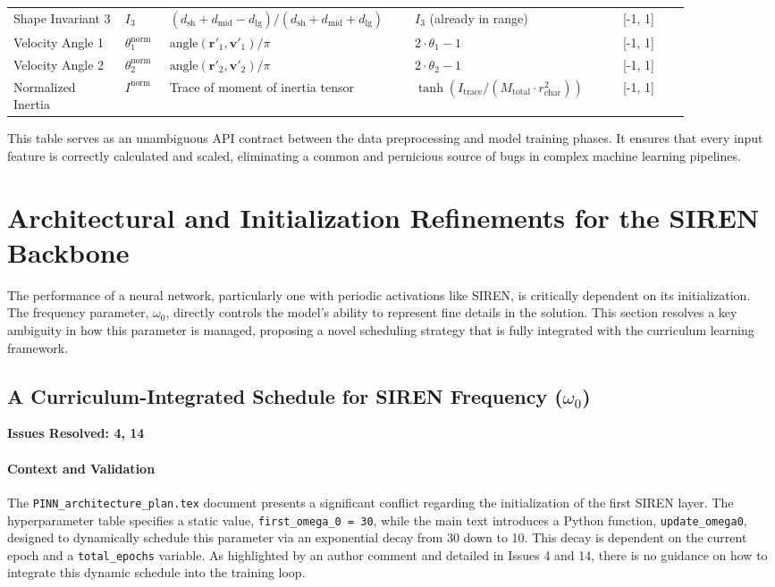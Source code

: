 \documentclass[11pt, a4paper]{article}
\begin{document}
\begin{longtable}{p{0.15\linewidth} p{0.06\linewidth} p{0.29\linewidth} p{0.29\linewidth} p{0.09\linewidth}}
Shape Invariant 3 & $I_3$ & $(d_{\text{sh}}+d_{\text{mid}}-d_{\text{lg}})/(d_{\text{sh}}+d_{\text{mid}}+d_{\text{lg}})$ & $I_3$ (already in range) & [-1, 1] \\
Velocity Angle 1 & $\theta_1^{\text{norm}}$ & $\text{angle}(\mathbf{r}'_1, \mathbf{v}'_1) / \pi$ & $2 \cdot \theta_1 - 1$ & [-1, 1] \\
Velocity Angle 2 & $\theta_2^{\text{norm}}$ & $\text{angle}(\mathbf{r}'_2, \mathbf{v}'_2) / \pi$ & $2 \cdot \theta_2 - 1$ & [-1, 1] \\
Normalized Inertia & $I^{\text{norm}}$ & Trace of moment of inertia tensor & $\tanh(I_{\text{trace}} / (M_{\text{total}} \cdot r_{\text{char}}^2))$ & [-1, 1] \\
\end{longtable}
\renewcommand{\arraystretch}{1.0}

This table serves as an unambiguous API contract between the data preprocessing and model training phases. It ensures that every input feature is correctly calculated and scaled, eliminating a common and pernicious source of bugs in complex machine learning pipelines.

\section{Architectural and Initialization Refinements for the SIREN Backbone}
The performance of a neural network, particularly one with periodic activations like SIREN, is critically dependent on its initialization. The frequency parameter, $\omega_0$, directly controls the model's ability to represent fine details in the solution. This section resolves a key ambiguity in how this parameter is managed, proposing a novel scheduling strategy that is fully integrated with the curriculum learning framework.

\subsection{A Curriculum-Integrated Schedule for SIREN Frequency (\texorpdfstring{$\omega_0$}{omega\_0})}
\textbf{Issues Resolved: 4, 14}
\paragraph{Context and Validation}
The \texttt{PINN\_architecture\_plan.tex} document presents a significant conflict regarding the initialization of the first SIREN layer. The hyperparameter table specifies a static value, \texttt{first\_omega\_0 = 30}, while the main text introduces a Python function, \texttt{update\_omega0}, designed to dynamically schedule this parameter via an exponential decay from 30 down to 10. This decay is dependent on the current epoch and a \texttt{total\_epochs} variable. As highlighted by an author comment and detailed in Issues 4 and 14, there is no guidance on how to integrate this dynamic schedule into the training loop.
\end{document}
